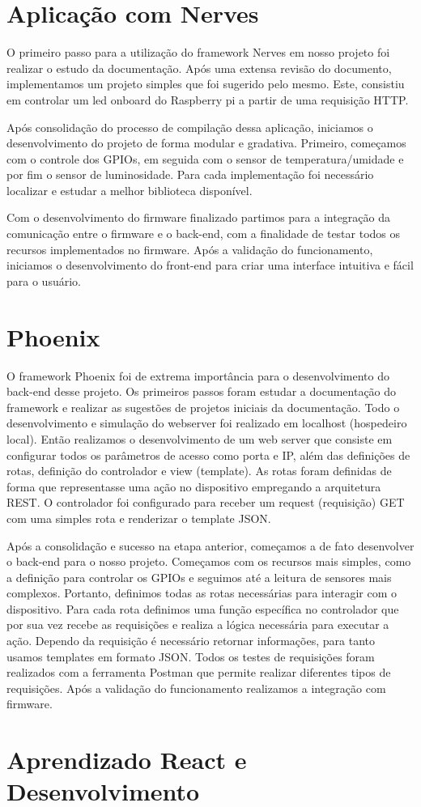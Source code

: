 \documentclass[../../layout.tex]{subfiles}
\begin{document}
\section{Aplicação com Nerves}
\hspace*{3em}O primeiro passo para a utilização do framework Nerves em nosso projeto foi realizar o estudo da documentação. Após uma extensa revisão do documento, implementamos um projeto simples que foi sugerido pelo mesmo. Este, consistiu em controlar um led onboard do Raspberry pi a partir de uma requisição HTTP.\par
Após consolidação do processo de compilação dessa aplicação, iniciamos o desenvolvimento do projeto de forma modular e gradativa. Primeiro, começamos com o controle dos GPIOs, em seguida com o sensor de temperatura/umidade e por fim o sensor de luminosidade. Para cada implementação  foi necessário localizar e estudar a melhor biblioteca disponível.\par 
Com o desenvolvimento do firmware finalizado partimos para a integração da comunicação entre o firmware e o back-end, com a finalidade de testar todos os recursos implementados no firmware. Após a validação do funcionamento, iniciamos o desenvolvimento do front-end para criar uma interface intuitiva e fácil para o usuário.

\section{Phoenix}
\hspace*{3em}O framework Phoenix foi de extrema importância para o desenvolvimento do back-end desse projeto. Os primeiros passos foram estudar a documentação do framework e realizar as sugestões de projetos iniciais da documentação. Todo o desenvolvimento e simulação do webserver foi realizado em localhost (hospedeiro local). Então realizamos o desenvolvimento de um web server que consiste em configurar todos os parâmetros de acesso como porta e IP, além  das definições de rotas, definição do controlador e view (template). As rotas foram definidas de forma que representasse uma ação no dispositivo  empregando a arquitetura REST. O controlador foi configurado para receber um request (requisição) GET com uma simples rota e renderizar o template  JSON.\par  
Após a consolidação e sucesso na etapa anterior, começamos a de fato desenvolver o back-end para o nosso projeto. Começamos com os recursos mais simples, como a definição para controlar os GPIOs e seguimos até a leitura de sensores mais complexos. Portanto, definimos todas as rotas necessárias para interagir com o dispositivo. Para cada rota definimos uma função específica no controlador que por sua vez recebe as requisições e realiza a lógica necessária para executar a ação. Dependo da requisição é necessário retornar informações, para tanto usamos templates  em formato JSON.  Todos os testes de requisições foram realizados com a ferramenta Postman que permite realizar diferentes tipos de requisições. Após a validação do funcionamento realizamos a integração com firmware. 

\section{Aprendizado React e Desenvolvimento}
\blindtext
\end{document}
